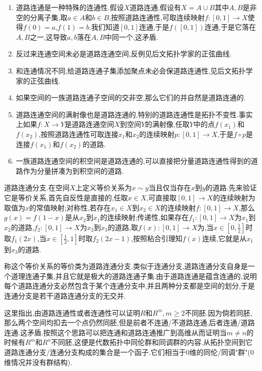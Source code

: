 \begin{enumerate}
	\item 道路连通是一种特殊的连通性.假设$X$道路连通,假设有$X=A\cup B$其中$A,B$是非空的分离子集,取$a\in A$和$b\in B$,按照道路连通性,可取连续映射$f:[0,1]\to X$使得$f(0)=a$,$f(1)=b$.我们知道$[0,1]$连通,于是$f([0,1])$连通,于是它落在$A,B$之一,这导致$a,b$落在$A,B$中同一个,这矛盾.
	\item 反过来连通空间未必是道路连通空间,反例见后文拓扑学家的正弦曲线.
	\item 和连通情况不同,给道路连通子集添加聚点未必会保道路连通性,见后文拓扑学家的正弦曲线.
	\item 如果空间的一族道路连通子空间的交非空,那么它们的并自然是道路连通的.
	\item 道路连通空间的满射像也是道路连通的,特别的道路连通性是拓扑不变性.事实上如果$f:X\to Y$是道路连通空间$X$到空间$Y$的满射像,任取$Y$中的点$f(x_1)$和$f(x_2)$,按照道路连通性可取连接$x_1$和$x_2$的连续映射$p:[0,1]\to X$,于是$f\circ p$是连接$f(x_1)$和$f(x_2)$的道路.
	\item 一族道路连通空间的积空间是道路连通的,可以直接把分量道路连通性得到的道路作为分量拼凑为到积空间的道路.
\end{enumerate}

道路连通分支.在空间$X$上定义等价关系为$x\sim y$当且仅当存在$x$到$y$的道路.先来验证它是等价关系,首先自反性是直接的,任取$x\in X$,可直接取$[0,1]\to X$的连续映射为取值为$x$的常值映射;对称性,若存在$x_1\in X$到$x_2\in X$的连续映射$f:[0,1]\to X$,那么$g(x)=f(1-x)$是从$x_2$到$x_1$的连续映射;传递性,如果存在$f_1:[0,1]\to X$为$x_1$到$x_2$的道路,$f_2:[0,1]\to X$为$x_2$到$x_3$的道路,取$f(x):[0,1]\to X$为,当$x\in[0,\frac{1}{2}]$时取$f_1(2x)$,当$x\in[\frac{1}{2},1]$时取$f_2(2x-1)$,按照粘合引理知$f(x)$连续,它就是从$x_1$到$x_3$的道路.

称这个等价关系的等价类为道路连通分支.类似于连通分支,道路连通分支自身是一个道理连通子集,并且它就是极大的道路连通子集.由于道路连通是蕴含连通的,说明每个道路连通分支必然包含于某个连通分支中,并且两种分支都是空间的划分,于是连通分支是若干道路连通分支的无交并.

这里指出,由道路连通性或者连通性可以证明$R$和$R^m,m\ge2$不同胚.因为倘若同胚,那么两个空间均扣去一个点仍然同胚,但是前者不连通/不道路连通,后者连通/道路连通.这矛盾.按照这个思路可以把连通和道路连通推广到高维从而证明当$m\not=n$的时候有$R^m$和$R^n$不同胚,这便是代数拓扑中同伦群和同调群的内容.从拓扑空间到它道路连通分支/连通分支构成的集合是一个函子.它们相当于0维的同伦/同调"群"(0维情况并没有群结构).

